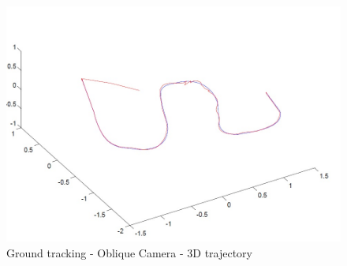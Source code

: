 \begin{figure}[h]
\centering
\includegraphics[width=0.7\linewidth]{../Images/c3/sim3_traj_both_3d}
\caption{Ground tracking - Oblique Camera - 3D trajectory}
\label{fig:sim3_traj_both_3d}
\end{figure}
